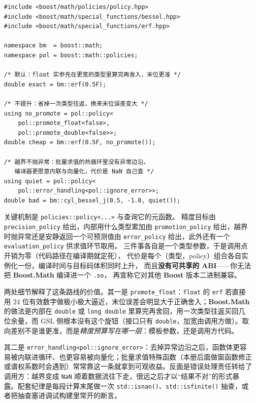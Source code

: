 \documentclass[12pt,a4paper,fontset=fandol]{ctexbook}
\newcommand{\Fn}[1]{\texttt{#1()}}
\newcommand{\Tp}[1]{\texttt{#1}}
\newcommand{\Bk}{\allowbreak}
\newcommand{\Lib}[1]{\textbf{#1}}
\begin{document}
\begin{lstlisting}[style=cppstyle,caption={\Lib{Boost.Math} 的 policy：精度、性能、错误处理都是编译期参数}]
#include <boost/math/policies/policy.hpp>
#include <boost/math/special_functions/bessel.hpp>
#include <boost/math/special_functions/erf.hpp>

namespace bm  = boost::math;
namespace pol = boost::math::policies;

/* 默认：float 实参先在更宽的类型里算完再舍入，末位更准 */
double exact = bm::erf(0.5F);

/* 不提升：省掉一次类型往返，换来末位误差变大 */
using no_promote = pol::policy<
    pol::promote_float<false>,
    pol::promote_double<false>>;
double cheap = bm::erf(0.5F, no_promote());

/* 越界不抛异常：批量求值的热循环里没有异常边沿，
   编译器更愿意内联与向量化，代价是 NaN 自己查 */
using quiet = pol::policy<
    pol::error_handling<pol::ignore_error>>;
double bad = bm::cyl_bessel_j(0.5, -1.0, quiet());
\end{lstlisting}

关键机制是 \Tp{policies::{\Bk}policy<...>} 与查询它的元函数。
精度目标由 \Tp{precision\_{\Bk}policy} 给出，内部用什么类型累加由
\Tp{promotion\_{\Bk}policy} 给出，越界时抛异常还是安静返回一个可预测值由
\Tp{error\_{\Bk}policy} 给出，此外还有一个 \Tp{evaluation\_{\Bk}policy} 供求值环节取用。
三件事各自是一个类型参数，于是调用点开销为零（代码路径在编译期就定死），
代价是每个（类型，policy）组合各自实例化一份，编译时间与目标码体积同时上升，
而且\textbf{没有可共享的 ABI}——你无法把 \Lib{Boost.Math} 编译进一个 \Tp{.so}，
再宣称它对其他 \Lib{Boost} 版本二进制兼容。

两处细节解释了这条路线的价值。其一是 \Tp{promote\_float}：\Tp{float} 的 \Tp{erf} 若直接用 24 位有效数字做极小极大逼近，末位误差会明显大于正确舍入；\Lib{Boost.Math} 的做法是内部在 \Tp{double} 或 \Tp{long double} 里算完再舍回，用一次类型往返买回几位余量，而 GSL 侧根本没有这个旋钮（接口只有 \Tp{double}，加宽由调用方做）。取向差别不是谁更准，而是\emph{精度预算写在哪一层}：模板参数，还是调用方代码。

其二是 \Tp{error\_handling<pol::ignore\_error>}：去掉异常边沿之后，函数体更容易被内联进循环、也更容易被向量化；批量求值特殊函数（本册后面做窗函数修正或谱权系数时会遇到）常常靠这一条就拿到可观收益。反面是错误处理责任转给了调用方：越界变成 \Tp{NaN} 顺着数据流往下走，很远之后才以``结果不对''的形式暴露。配套纪律是每段计算末尾做一次 \Fn{std::isnan}、\Fn{std::isfinite} 抽查，或者把抽查塞进调试构建里常开的断言。
\end{document}
